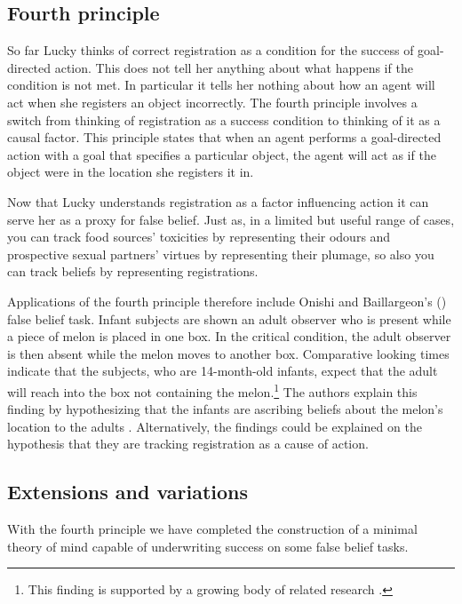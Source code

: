 \documentclass[12pt,\papersize]{extarticle}
\begin{document}
\subsection{Fourth principle}

So far Lucky thinks of correct registration as a condition for the success of goal-directed action.  This does not tell her anything about what happens if the condition is not met.  In particular it tells her nothing about how an agent will act when she registers an object incorrectly.  The fourth principle involves a switch from thinking of registration as a success condition to thinking of it as a causal factor.  This principle states that when an agent performs a goal-directed action with a goal that specifies a particular object, the agent will act as if the object were in the location she registers it in.

Now that Lucky understands registration as a factor influencing action it can serve her as a proxy for false belief.  Just as, in a limited but useful range of cases, you can track food sources' toxicities by representing their odours
and prospective sexual partners’ virtues by representing their plumage, so also you can track beliefs by representing registrations.

Applications of the fourth principle therefore include Onishi and Baillargeon’s (\citeyear[]{en_1092}) false belief task.  Infant subjects are shown an adult observer who is present while a piece of melon is placed in one box.  In the critical condition, the adult observer is then absent while the melon moves to another box.  Comparative looking times indicate that the subjects, who are 14-month-old infants, expect that the adult will reach into the box not containing the melon.\footnote{ 	This finding is supported by a growing body of related research \citep[including][]{en_1666, en_1690, en_1691, en_1208, en_1261}.}  The authors explain this finding by hypothesizing that the infants are ascribing beliefs about the melon’s location to the adults \citep[][p.\ 257]{en_1092}.  Alternatively, the findings could be explained on the hypothesis that they are tracking registration as a cause of action.

\subsection{Extensions and variations}
With the fourth principle we have completed the construction of a minimal theory of mind capable of underwriting success on some false belief tasks.  
\end{document}
